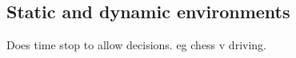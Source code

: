 
\subsection{Static and dynamic environments}

Does time stop to allow decisions. eg chess v driving.

